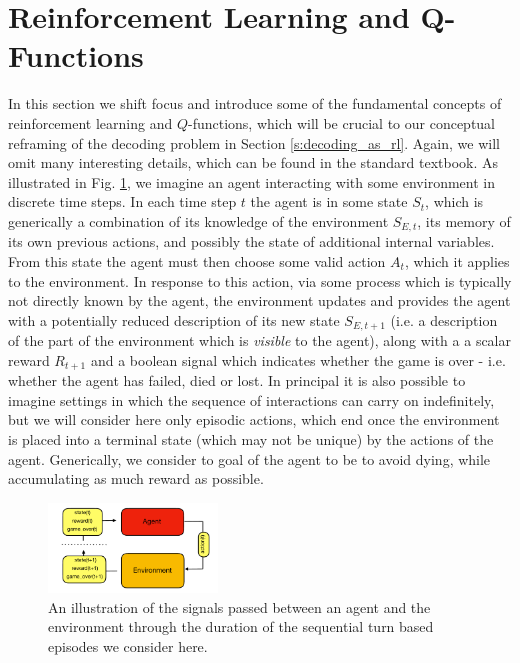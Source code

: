 \documentclass[twocolumn,preprintnumbers,amsmath,amssymb,notitlepage,nofootinbib,longbibliography,superscriptaddress,aps,pra,10pt]{revtex4-1}
\begin{document}
\section{Reinforcement Learning and Q-Functions}\label{s:reinforcement_learning}

    In this section we shift focus and introduce some of the fundamental concepts of reinforcement learning and $Q$-functions, which will be crucial to our conceptual reframing of the decoding problem in Section \ref{s:decoding_as_rl}. Again, we will omit many interesting details, which can be found in the standard textbook. As illustrated in Fig. \ref{f:agent_environment}, we imagine an agent interacting with some environment in discrete time steps. In each time step $t$ the agent is in some state $S_t$, which is generically a combination of its knowledge of the environment $S_{E,t}$, its memory of its own previous actions, and possibly the state of additional internal variables. From this state the agent must then choose some valid action $A_t$, which it applies to the environment. In response to this action, via some process which is typically not directly known by the agent, the environment updates and provides the agent with a potentially reduced description of its new state $S_{E,t+1}$ (i.e. a description of the part of the environment which is \textit{visible} to the agent), along with a a scalar reward $R_{t+1}$ and a boolean signal which indicates whether the game is over - i.e. whether the agent has failed, died or lost. In principal it is also possible to imagine settings in which the sequence of interactions can carry on indefinitely, but we will consider here only episodic actions, which end once the environment is placed into a terminal state (which may not be unique) by the actions of the agent. Generically, we consider to goal of the agent to be to avoid dying, while accumulating as much reward as possible.

    \begin{figure}
      \centering
          \includegraphics[width=0.4\textwidth]{agent_environment.pdf}
      \caption{An illustration of the signals passed between an agent and the environment through the duration of the sequential turn based episodes we consider here.}\label{f:agent_environment}
    \end{figure}
\end{document}
